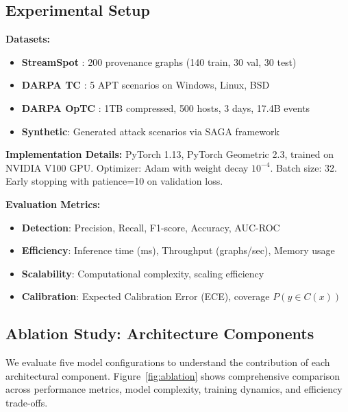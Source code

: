\documentclass[conference]{IEEEtran}
\begin{document}
\subsection{Experimental Setup}

\textbf{Datasets:}
\begin{itemize}
    \item \textbf{StreamSpot} \cite{streamspot}: 200 provenance graphs (140 train, 30 val, 30 test)
    \item \textbf{DARPA TC} \cite{darpa_tc}: 5 APT scenarios on Windows, Linux, BSD
    \item \textbf{DARPA OpTC} \cite{optic_dataset}: 1TB compressed, 500 hosts, 3 days, 17.4B events
    \item \textbf{Synthetic}: Generated attack scenarios via SAGA framework \cite{saga}
\end{itemize}

\textbf{Implementation Details:}
PyTorch 1.13, PyTorch Geometric 2.3, trained on NVIDIA V100 GPU. Optimizer: Adam with weight decay $10^{-4}$. Batch size: 32. Early stopping with patience=10 on validation loss.

\textbf{Evaluation Metrics:}
\begin{itemize}
    \item \textbf{Detection}: Precision, Recall, F1-score, Accuracy, AUC-ROC
    \item \textbf{Efficiency}: Inference time (ms), Throughput (graphs/sec), Memory usage
    \item \textbf{Scalability}: Computational complexity, scaling efficiency
    \item \textbf{Calibration}: Expected Calibration Error (ECE), coverage $P(y \in C(x))$
\end{itemize}

\subsection{Ablation Study: Architecture Components}

We evaluate five model configurations to understand the contribution of each architectural component. Figure~\ref{fig:ablation} shows comprehensive comparison across performance metrics, model complexity, training dynamics, and efficiency trade-offs.
\end{document}
